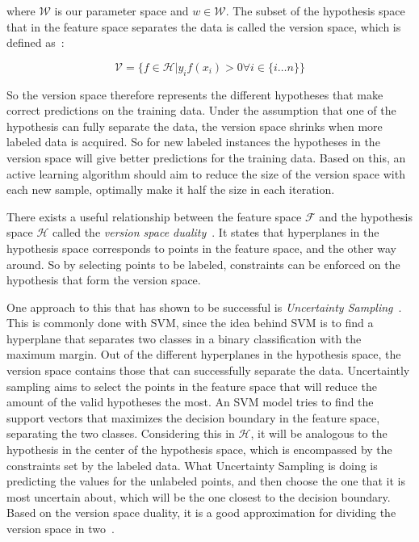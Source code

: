 where $\mathcal{W}$ is our parameter space and $w \in \mathcal{W}$.
The subset of the hypothesis space that in the feature space separates the data is called the version space, which is defined as~\cite{settles2012active,tong2001support}:

\begin{equation}\label{eq:version-space}
    \mathcal{V} = \Bigg \{ f \in \mathcal{H} | y_i f(x_i) > 0 \forall i \in \{i \dots n\} \Bigg \}
\end{equation}

So the version space therefore represents the different hypotheses that make correct predictions on the training data.
Under the assumption that one of the hypothesis can fully separate the data, the version space shrinks when more labeled data is acquired.
So for new labeled instances the hypotheses in the version space will give better predictions for the training data.
Based on this, an active learning algorithm should aim to reduce the size of the version space with each new sample, optimally make it half the size in each iteration.

There exists a useful relationship between the feature space $\mathcal{F}$ and the hypothesis space $\mathcal{H}$ called the \textit{version space duality}~\cite{tong2001support, vapnik1998statistical}.
It states that hyperplanes in the hypothesis space corresponds to points in the feature space, and the other way around.
So by selecting points to be labeled, constraints can be enforced on the hypothesis that form the version space.

One approach to this that has shown to be successful is \textit{Uncertainty Sampling}~\cite{settles2012active}.
This is commonly done with SVM, since the idea behind SVM is to find a hyperplane that separates two classes in a binary classification with the maximum margin.
Out of the different hyperplanes in the hypothesis space, the version space contains those that can successfully separate the data.
Uncertaintly sampling aims to select the points in the feature space that will reduce the amount of the valid hypotheses the most.
An SVM model tries to find the support vectors that maximizes the decision boundary in the feature space, separating the two classes.
Considering this in $\mathcal{H}$, it will be analogous to the hypothesis in the center of the hypothesis space, which is encompassed by the constraints set by the labeled data.
What Uncertainty Sampling is doing is predicting the values for the unlabeled points, and then choose the one that it is most uncertain about, which will be the one closest to the decision boundary.
Based on the version space duality, it is a good approximation for dividing the version space in two~\cite{settles2012active}.

